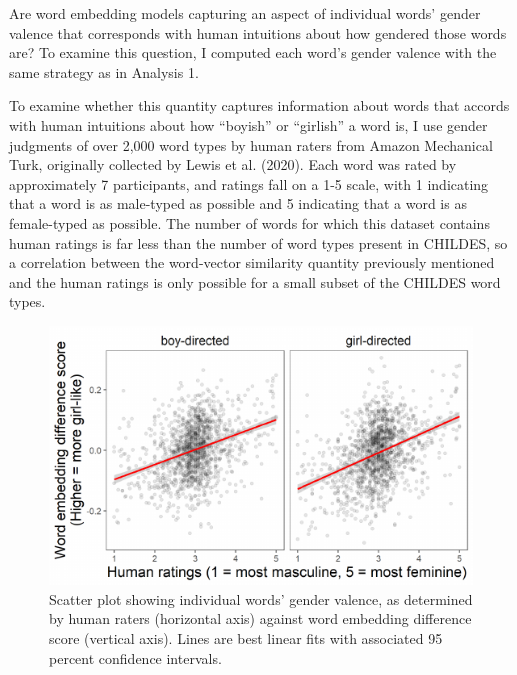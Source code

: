 \documentclass[10pt, letterpaper]{article}
\newenvironment{CodeChunk}{}{}
\begin{document}
Are word embedding models capturing an aspect of individual words'
gender valence that corresponds with human intuitions about how gendered
those words are? To examine this question, I computed each word's gender
valence with the same strategy as in Analysis 1.

To examine whether this quantity captures information about words that
accords with human intuitions about how ``boyish'' or ``girlish'' a word
is, I use gender judgments of over 2,000 word types by human raters from
Amazon Mechanical Turk, originally collected by Lewis et al. (2020).
Each word was rated by approximately 7 participants, and ratings fall on
a 1-5 scale, with 1 indicating that a word is as male-typed as possible
and 5 indicating that a word is as female-typed as possible. The number
of words for which this dataset contains human ratings is far less than
the number of word types present in CHILDES, so a correlation between
the word-vector similarity quantity previously mentioned and the human
ratings is only possible for a small subset of the CHILDES word types.

\begin{CodeChunk}
\begin{figure}[h]

{\centering \includegraphics{figs/human_plot-1} 

}

\caption[Scatter plot showing individual words' gender valence, as determined by human raters (horizontal axis) against word embedding difference score (vertical axis)]{Scatter plot showing individual words' gender valence, as determined by human raters (horizontal axis) against word embedding difference score (vertical axis). Lines are best linear fits with associated 95 percent confidence intervals.}\label{fig:human_plot}
\end{figure}
\end{CodeChunk}
\end{document}
